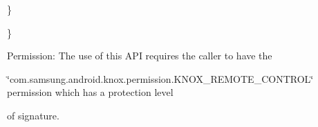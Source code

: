 \begin{DoxyPre}     \}\end{DoxyPre}



\begin{DoxyPre}  \}\end{DoxyPre}



\begin{DoxyPre} \end{DoxyPre}


\begin{DoxyParagraph}{\-Permission\-: }
\-The use of this \-A\-P\-I requires the caller to have the
\end{DoxyParagraph}
\char`\"{}com.\-samsung.\-android.\-knox.\-permission.\-K\-N\-O\-X\-\_\-\-R\-E\-M\-O\-T\-E\-\_\-\-C\-O\-N\-T\-R\-O\-L\char`\"{} permission which has a protection level

of signature.


